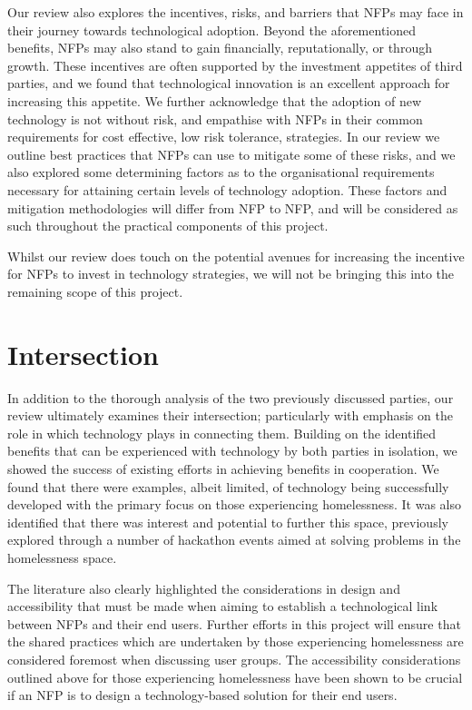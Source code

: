 Our review also explores the incentives, risks, and barriers that NFPs may face in their journey towards technological adoption. Beyond the aforementioned benefits, NFPs may also stand to gain financially, reputationally, or through growth. These incentives are often supported by the investment appetites of third parties, and we found that technological innovation is an excellent approach for increasing this appetite. We further acknowledge that the adoption of new technology is not without risk, and empathise with NFPs in their common requirements for cost effective, low risk tolerance, strategies. In our review we outline best practices that NFPs can use to mitigate some of these risks, and we also explored some determining factors as to the organisational requirements necessary for attaining certain levels of technology adoption. These factors and mitigation methodologies will differ from NFP to NFP, and will be considered as such throughout the practical components of this project.

Whilst our review does touch on the potential avenues for increasing the incentive for NFPs to invest in technology strategies, we will not be bringing this into the remaining scope of this project.

\section{Intersection}

In addition to the thorough analysis of the two previously discussed parties, our review ultimately examines their intersection; particularly with emphasis on the role in which technology plays in connecting them. Building on the identified benefits that can be experienced with technology by both parties in isolation, we showed the success of existing efforts in achieving benefits in cooperation. We found that there were examples, albeit limited, of technology being successfully developed with the primary focus on those experiencing homelessness. It was also identified that there was interest and potential to further this space, previously explored through a number of hackathon events aimed at solving problems in the homelessness space.

The literature also clearly highlighted the considerations in design and accessibility that must be made when aiming to establish a technological link between NFPs and their end users. Further efforts in this project will ensure that the shared practices which are undertaken by those experiencing homelessness are considered foremost when discussing user groups. The accessibility considerations outlined above for those experiencing homelessness have been shown to be crucial if an NFP is to design a technology-based solution for their end users.

